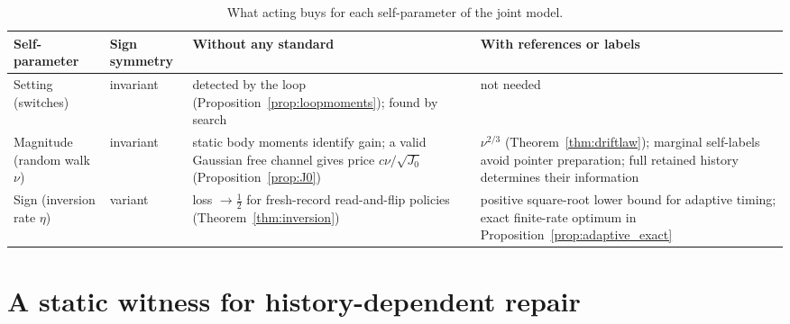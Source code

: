 \documentclass[12pt]{article}
\theoremstyle{definition}
\begin{document}
\begin{table}[t]
\centering
\small
\begin{tabular}{@{}P{3.0cm}P{1.7cm}P{4.0cm}P{3.9cm}@{}}
\toprule
Self-parameter & Sign symmetry & Without any standard & With references or labels\\
\midrule
Setting (switches) & invariant & detected by the loop (Proposition~\ref{prop:loopmoments}); found by search & not needed\\[3pt]
Magnitude (random walk $\nu$) & invariant & static body moments identify gain; a valid Gaussian free channel gives price $c\nu/\sqrt{J_0}$ (Proposition~\ref{prop:J0}) & $\nu^{2/3}$ (Theorem~\ref{thm:driftlaw}); marginal self-labels avoid pointer preparation; full retained history determines their information\\[3pt]
Sign (inversion rate $\eta$) & variant & loss $\to\tfrac12$ for fresh-record read-and-flip policies (Theorem~\ref{thm:inversion}) & positive square-root lower bound for adaptive timing; exact finite-rate optimum in Proposition~\ref{prop:adaptive_exact}\\
\bottomrule
\end{tabular}
\caption{What acting buys for each self-parameter of the joint model.}
\label{tab:threelaws}
\end{table}

\section{A static witness for history-dependent repair}
\label{app:repair_static}
\end{document}
